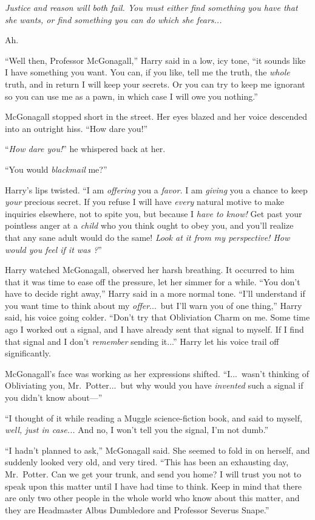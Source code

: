 \emph{Justice and reason will both fail. You must either find something you have that she wants, or find something you can do which she fears...}

Ah.

“Well then, Professor McGonagall,” Harry said in a low, icy tone, “it sounds like I have something you want. You can, if you like, tell me the truth, the \emph{whole} truth, and in return I will keep your secrets. Or you can try to keep me ignorant so you can use me as a pawn, in which case I will owe you nothing.”

McGonagall stopped short in the street. Her eyes blazed and her voice descended into an outright hiss. “How dare you!”

“\emph{How dare you!}” he whispered back at her.

“You would \emph{blackmail} me?”

Harry’s lips twisted. “I am \emph{offering} you a \emph{favor.} I am \emph{giving} you a chance to keep \emph{your} precious secret. If you refuse I will have \emph{every} natural motive to make inquiries elsewhere, not to spite you, but because I \emph{have to know!} Get past your pointless anger at a \emph{child} who you think ought to obey you, and you’ll realize that any sane adult would do the same! \emph{Look at it from my perspective! How would you feel if it was ?}”

Harry watched McGonagall, observed her harsh breathing. It occurred to him that it was time to ease off the pressure, let her simmer for a while. “You don’t have to decide right away,” Harry said in a more normal tone. “I’ll understand if you want time to think about my \emph{offer}...\ but I’ll warn you of one thing,” Harry said, his voice going colder. “Don’t try that Obliviation Charm on me. Some time ago I worked out a signal, and I have already sent that signal to myself. If I find that signal and I don’t \emph{remember} sending it...” Harry let his voice trail off significantly.

McGonagall’s face was working as her expressions shifted. “I...\ wasn’t thinking of Obliviating you, Mr.~Potter...\ but why would you have \emph{invented} such a signal if you didn’t know about—”

“I thought of it while reading a Muggle science-fiction book, and said to myself, \emph{well, just in case...} And no, I won’t tell you the signal, I’m not dumb.”

“I hadn’t planned to ask,” McGonagall said. She seemed to fold in on herself, and suddenly looked very old, and very tired. “This has been an exhausting day, Mr.~Potter. Can we get your trunk, and send you home? I will trust you not to speak upon this matter until I have had time to think. Keep in mind that there are only two other people in the whole world who know about this matter, and they are Headmaster Albus Dumbledore and Professor Severus Snape.”

